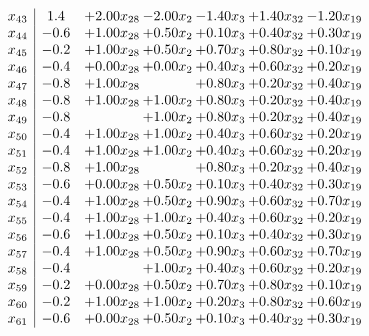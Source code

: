 \documentclass[8pt]{article}
\begin{document}
\[\begin{array}{c| c c@{\hskip 2pt} c@{\hskip 2pt} c@{\hskip 2pt} c@{\hskip 2pt} c@{\hskip 2pt} }
 x_{43}   &  1.4 & +  2.00 x_{28} & -2.00 x_{2} & -1.40 x_{3} & +  1.40 x_{32} & -1.20 x_{19}\\
 x_{44}   &  -0.6 & +  1.00 x_{28} & +  0.50 x_{2} & +  0.10 x_{3} & +  0.40 x_{32} & +  0.30 x_{19}\\
 x_{45}   &  -0.2 & +  1.00 x_{28} & +  0.50 x_{2} & +  0.70 x_{3} & +  0.80 x_{32} & +  0.10 x_{19}\\
 x_{46}   &  -0.4 & +  0.00 x_{28} & +  0.00 x_{2} & +  0.40 x_{3} & +  0.60 x_{32} & +  0.20 x_{19}\\
 x_{47}   &  -0.8 & +  1.00 x_{28} &   & +  0.80 x_{3} & +  0.20 x_{32} & +  0.40 x_{19}\\
 x_{48}   &  -0.8 & +  1.00 x_{28} & +  1.00 x_{2} & +  0.80 x_{3} & +  0.20 x_{32} & +  0.40 x_{19}\\
 x_{49}   &  -0.8  &   & +  1.00 x_{2} & +  0.80 x_{3} & +  0.20 x_{32} & +  0.40 x_{19}\\
 x_{50}   &  -0.4 & +  1.00 x_{28} & +  1.00 x_{2} & +  0.40 x_{3} & +  0.60 x_{32} & +  0.20 x_{19}\\
 x_{51}   &  -0.4 & +  1.00 x_{28} & +  1.00 x_{2} & +  0.40 x_{3} & +  0.60 x_{32} & +  0.20 x_{19}\\
 x_{52}   &  -0.8 & +  1.00 x_{28} &   & +  0.80 x_{3} & +  0.20 x_{32} & +  0.40 x_{19}\\
 x_{53}   &  -0.6 & +  0.00 x_{28} & +  0.50 x_{2} & +  0.10 x_{3} & +  0.40 x_{32} & +  0.30 x_{19}\\
 x_{54}   &  -0.4 & +  1.00 x_{28} & +  0.50 x_{2} & +  0.90 x_{3} & +  0.60 x_{32} & +  0.70 x_{19}\\
 x_{55}   &  -0.4 & +  1.00 x_{28} & +  1.00 x_{2} & +  0.40 x_{3} & +  0.60 x_{32} & +  0.20 x_{19}\\
 x_{56}   &  -0.6 & +  1.00 x_{28} & +  0.50 x_{2} & +  0.10 x_{3} & +  0.40 x_{32} & +  0.30 x_{19}\\
 x_{57}   &  -0.4 & +  1.00 x_{28} & +  0.50 x_{2} & +  0.90 x_{3} & +  0.60 x_{32} & +  0.70 x_{19}\\
 x_{58}   &  -0.4  &   & +  1.00 x_{2} & +  0.40 x_{3} & +  0.60 x_{32} & +  0.20 x_{19}\\
 x_{59}   &  -0.2 & +  0.00 x_{28} & +  0.50 x_{2} & +  0.70 x_{3} & +  0.80 x_{32} & +  0.10 x_{19}\\
 x_{60}   &  -0.2 & +  1.00 x_{28} & +  1.00 x_{2} & +  0.20 x_{3} & +  0.80 x_{32} & +  0.60 x_{19}\\
 x_{61}   &  -0.6 & +  0.00 x_{28} & +  0.50 x_{2} & +  0.10 x_{3} & +  0.40 x_{32} & +  0.30 x_{19}\\

\end{array}\]
\end{document}
